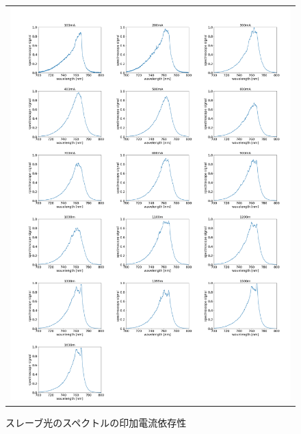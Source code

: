 \documentclass[uplatex, dvipdfmx, a4paper, report, papersize, 11pt]{jsbook}
\begin{document}
\newpage
\begin{figure}[H]
  \centering
    \begin{tabular}{c}
      \begin{minipage}{1\hsize}
        \centering
          \includegraphics[keepaspectratio,  scale=0.20,  angle=0]
                          {figures/chapter4/766_slave-current_spectrum.png}
                          \caption{スレーブ光のスペクトルの印加電流依存性}
                          \label{766_slave-current_spectrum}
      \end{minipage}

  \end{tabular}
\end{figure}

\newpage
\end{document}

